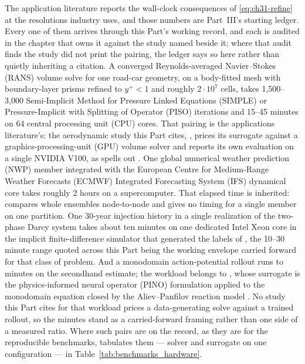The application literature reports the wall-clock consequences of \eqref{eq:ch31-refine} at the
resolutions industry uses, and those numbers are Part~III's starting ledger. Every one of them
arrives through this Part's working record, and each is audited in the chapter that owns it against
the study named beside it; where that audit finds the study did not print the pairing, the ledger
says so here rather than quietly inheriting a citation. A converged
Reynolds-averaged Navier--Stokes (RANS) volume solve for one road-car geometry, on a body-fitted
mesh with boundary-layer prisms refined to $y^{+} < 1$ and roughly $2 \cdot 10^{7}$ cells, takes
1{,}500--3{,}000 Semi-Implicit Method for Pressure Linked Equations (SIMPLE) or
Pressure-Implicit with Splitting of Operator (PISO) iterations and 15--45 minutes on 64 central
processing unit (CPU) cores. That pairing is the applications literature's: the aerodynamic study
this Part cites, \cite{li2023geometry}, prices its surrogate against a
graphics-processing-unit (GPU) volume solver and reports its own evaluation on a single NVIDIA
V100, as  spells out
.
One global numerical weather prediction (NWP) member integrated with the European Centre for
Medium-Range Weather Forecasts (ECMWF) Integrated Forecasting System (IFS) dynamical core takes
roughly 2 hours on a supercomputer. That elapsed time is inherited:
\cite{pathak2022fourcastnet} compares whole ensembles node-to-node and gives no timing for a
single member on one partition.
One 30-year injection history in a single realization of the two-phase Darcy system takes about
ten minutes on one dedicated Intel Xeon core in the implicit finite-difference simulator that
generated the labels of \cite{wen2022ufno}, the 10--30 minute range quoted across this Part being
the working envelope carried forward for that class of problem. And a monodomain action-potential
rollout runs to minutes on the secondhand estimate; the workload belongs to
, whose surrogate is the
physics-informed neural operator (PINO) formulation \cite{li2021physics} applied to the monodomain
equation closed by the Aliev--Panfilov reaction model \cite{aliev1996simple}. No study
this Part cites for that workload prices a data-generating solve against a trained rollout, so
the minutes stand as a carried-forward framing rather than one side of a measured
ratio.
Where such pairs are on the record, as they are for the reproducible benchmarks,
 tabulates them --- solver and
surrogate on one configuration --- in Table~\ref{tab:benchmarks_hardware}.

